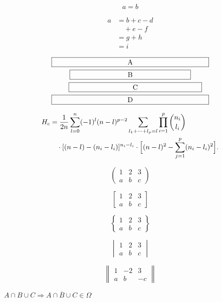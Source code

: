 \documentclass[12pt,ngerman]{scrartcl}
\begin{document}
\begin{equation*}
a=b
\end{equation*}

\begin{equation}\label{xx} %
\begin{split}
a& =b+c-d\\
& \quad +e-f\\
& =g+h\\
& =i
\end{split}
\end{equation}

\begin{multline}
\framebox[.65\columnwidth]{A}\\
\framebox[.5\columnwidth]{B}\\
\shoveright{\framebox[.55\columnwidth]{C}}\\
\framebox[.65\columnwidth]{D}
\end{multline}


\begin{equation}\label{e:barwq}\begin{split}
H_c&=\frac{1}{2n} \sum^n_{l=0}(-1)^{l}(n-{l})^{p-2}
\sum_{l _1+\dots+ l _p=l}\prod^p_{i=1} \binom{n_i}{l _i}\\
&\quad\cdot[(n-l )-(n_i-l _i)]^{n_i-l _i}\cdot
\Bigl[(n-l )^2-\sum^p_{j=1}(n_i-l _i)^2\Bigr].
\end{split}\end{equation}

\begin{equation}
\begin{pmatrix}
1 & 2 & 3\\
a & b & c
\end{pmatrix}
\end{equation}

\begin{equation}
\begin{bmatrix}
1 & 2 & 3\\
a & b & c
\end{bmatrix}
\end{equation}

\begin{equation}
\begin{Bmatrix}
1 & 2 & 3\\
a & b & c
\end{Bmatrix}
\end{equation}

\begin{equation}
\begin{vmatrix}
1 & 2 & 3\\
a & b & c
\end{vmatrix}
\end{equation}

\begin{equation}
\begin{Vmatrix}
1 & -2 & 3\\
a & b & -c
\end{Vmatrix}
\end{equation}

\( A \cap B  \cup C \Rightarrow \overline{A \cap B  \cup C} \in \Omega \)
\end{document}
